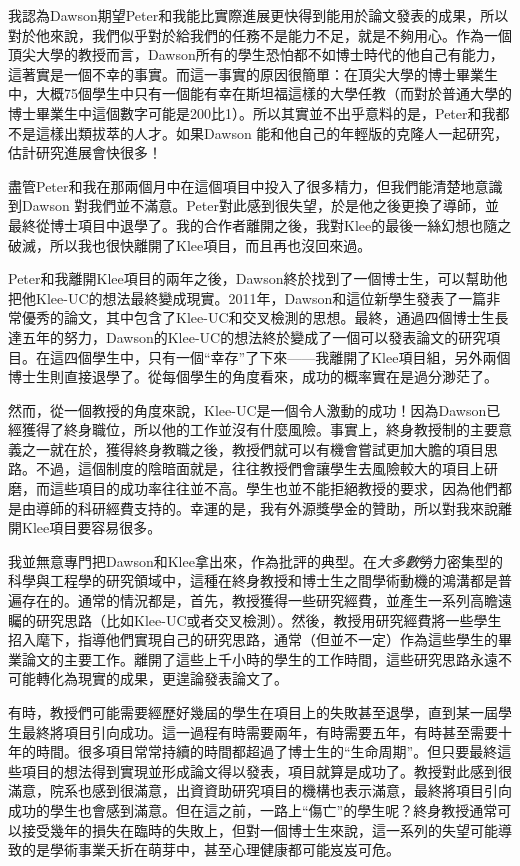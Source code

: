 \documentclass[12pt,UTF8,nofonts]{book}
\begin{document}
我認為Dawson期望Peter和我能比實際進展更快得到能用於論文發表的成果，所以對於他來說，我們似乎對於給我們的任務不是能力不足，就是不夠用心。作為一個頂尖大學的教授而言，Dawson所有的學生恐怕都不如博士時代的他自己有能力，這著實是一個不幸的事實。而這一事實的原因很簡單：在頂尖大學的博士畢業生中，大概75個學生中只有一個能有幸在斯坦福這樣的大學任教（而對於普通大學的博士畢業生中這個數字可能是200比1）。所以其實並不出乎意料的是，Peter和我都不是這樣出類拔萃的人才。如果Dawson 能和他自己的年輕版的克隆人一起研究，估計研究進展會快很多！

盡管Peter和我在那兩個月中在這個項目中投入了很多精力，但我們能清楚地意識到Dawson 對我們並不滿意。Peter對此感到很失望，於是他之後更換了導師，並最終從博士項目中退學了。我的合作者離開之後，我對Klee的最後一絲幻想也隨之破滅，所以我也很快離開了Klee項目，而且再也沒回來過。

\breakline

Peter和我離開Klee項目的兩年之後，Dawson終於找到了一個博士生，可以幫助他把他Klee-UC的想法最終變成現實。2011年，Dawson和這位新學生發表了一篇非常優秀的論文，其中包含了Klee-UC和交叉檢測的思想。最終，通過四個博士生長達五年的努力，Dawson的Klee-UC的想法終於變成了一個可以發表論文的研究項目。在這四個學生中，只有一個“幸存”了下來——我離開了Klee項目組，另外兩個博士生則直接退學了。從每個學生的角度看來，成功的概率實在是過分渺茫了。

然而，從一個教授的角度來說，Klee-UC是一個令人激動的成功！因為Dawson已經獲得了終身職位，所以他的工作並沒有什麼風險。事實上，終身教授制的主要意義之一就在於，獲得終身教職之後，教授們就可以有機會嘗試更加大膽的項目思路。不過，這個制度的陰暗面就是，往往教授們會讓學生去風險較大的項目上研磨，而這些項目的成功率往往並不高。學生也並不能拒絕教授的要求，因為他們都是由導師的科研經費支持的。幸運的是，我有外源獎學金的贊助，所以對我來說離開Klee項目要容易很多。

我並無意專門把Dawson和Klee拿出來，作為批評的典型。在\emph{大多數}勞力密集型的科學與工程學的研究領域中，這種在終身教授和博士生之間學術動機的鴻溝都是普遍存在的。通常的情況都是，首先，教授獲得一些研究經費，並產生一系列高瞻遠矚的研究思路（比如Klee-UC或者交叉檢測）。然後，教授用研究經費將一些學生招入麾下，指導他們實現自己的研究思路，通常（但並不一定）作為這些學生的畢業論文的主要工作。離開了這些上千小時的學生的工作時間，這些研究思路永遠不可能轉化為現實的成果，更遑論發表論文了。

有時，教授們可能需要經歷好幾屆的學生在項目上的失敗甚至退學，直到某一屆學生最終將項目引向成功。這一過程有時需要兩年，有時需要五年，有時甚至需要十年的時間。很多項目常常持續的時間都超過了博士生的“生命周期”。但只要最終這些項目的想法得到實現並形成論文得以發表，項目就算是成功了。教授對此感到很滿意，院系也感到很滿意，出資資助研究項目的機構也表示滿意，最終將項目引向成功的學生也會感到滿意。但在這之前，一路上“傷亡”的學生呢？終身教授通常可以接受幾年的損失在臨時的失敗上，但對一個博士生來說，這一系列的失望可能導致的是學術事業夭折在萌芽中，甚至心理健康都可能岌岌可危。
\end{document}
